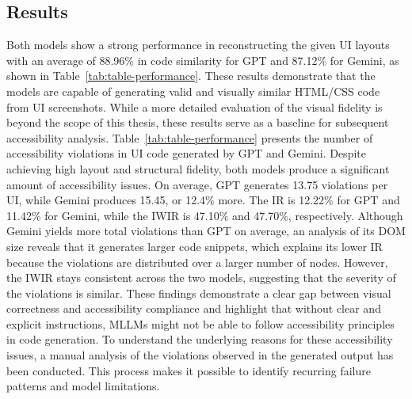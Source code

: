 \subsection{Results}
Both models show a strong performance in reconstructing the given 
UI layouts with an average of 88.96\% in code similarity
for GPT and 87.12\% for Gemini, as shown in Table~\ref{tab:table-performance}.
These results demonstrate that the models are capable of generating 
valid and visually similar HTML/CSS code from UI screenshots. 
While a more detailed evaluation of the visual fidelity is beyond 
the scope of this thesis, these results serve as a baseline 
for subsequent accessibility analysis.
Table~\ref{tab:table-performance} presents the number of accessibility 
violations in UI code generated by GPT and Gemini. Despite 
achieving high layout and structural fidelity, both models produce 
a significant amount of accessibility issues. On average, GPT 
generates 13.75 violations per UI, while Gemini produces 15.45, or 12.4\% 
more. The IR is 12.22\% for GPT and 11.42\% for Gemini,
while the IWIR is 47.10\% and 47.70\%, respectively. Although Gemini yields
more total violations than GPT on average, an analysis of its DOM size 
reveals that it generates larger code snippets, which explains
its lower IR because the violations are distributed over a larger 
number of nodes. However, the IWIR stays consistent across the two models, 
suggesting that the severity of the violations is similar.
These findings demonstrate a clear gap between visual correctness and 
accessibility compliance and highlight that without clear and 
explicit instructions, MLLMs might not be able to follow 
accessibility principles in code generation. To understand 
the underlying reasons for these accessibility issues, a manual 
analysis of the violations observed in the generated output
has been conducted. This process makes it possible to identify recurring 
failure patterns and model limitations.



